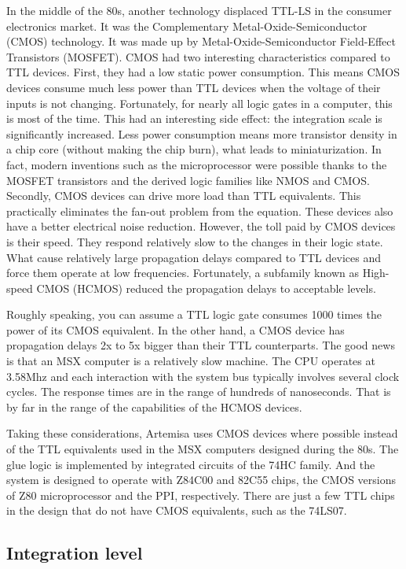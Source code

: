 In the middle of the 80s, another technology displaced TTL-LS in the consumer electronics market. It was the Complementary Metal-Oxide-Semiconductor (CMOS) technology. It was made up by Metal-Oxide-Semiconductor Field-Effect Transistors (MOSFET). CMOS had two interesting characteristics compared to TTL devices. First, they had a low static power consumption. This means CMOS devices consume much less power than TTL devices when the voltage of their inputs is not changing. Fortunately, for nearly all logic gates in a computer, this is most of the time. This had an interesting side effect: the integration scale is significantly increased. Less power consumption means more transistor density in a chip core (without making the chip burn), what leads to miniaturization. In fact, modern inventions such as the microprocessor were possible thanks to the MOSFET transistors and the derived logic families like NMOS and CMOS. Secondly, CMOS devices can drive more load than TTL equivalents. This practically eliminates the fan-out problem from the equation. These devices also have a better electrical noise reduction. However, the toll paid by CMOS devices is their speed. They respond relatively slow to the changes in their logic state. What cause relatively large propagation delays compared to TTL devices and force them operate at low frequencies. Fortunately, a subfamily known as High-speed CMOS (HCMOS) reduced the propagation delays to acceptable levels.

Roughly speaking, you can assume a TTL logic gate consumes 1000 times the power of its CMOS equivalent. In the other hand, a CMOS device has propagation delays 2x to 5x bigger than their TTL counterparts. The good news is that an MSX computer is a relatively slow machine. The CPU operates at 3.58Mhz and each interaction with the system bus typically involves several clock cycles. The response times are in the range of hundreds of nanoseconds. That is by far in the range of the capabilities of the HCMOS devices.

Taking these considerations, Artemisa uses CMOS devices where possible instead of the TTL equivalents used in the MSX computers designed during the 80s. The glue logic is implemented by integrated circuits of the 74HC family. And the system is designed to operate with Z84C00 and 82C55 chips, the CMOS versions of Z80 microprocessor and the PPI, respectively. There are just a few TTL chips in the design that do not have CMOS equivalents, such as the 74LS07.

\subsection{Integration level}

